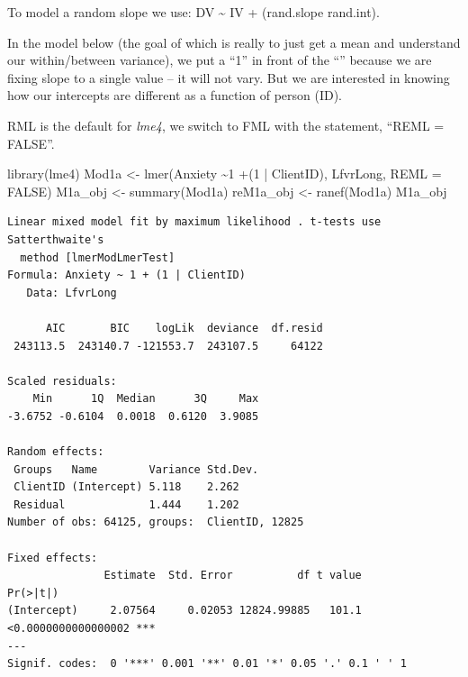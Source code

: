 \documentclass[
  11pt,
]{book}
\newenvironment{Shaded}{\begin{snugshade}}{\end{snugshade}}
\newcommand{\AttributeTok}[1]{\textcolor[rgb]{0.77,0.63,0.00}{#1}}
\newcommand{\ConstantTok}[1]{\textcolor[rgb]{0.00,0.00,0.00}{#1}}
\newcommand{\DecValTok}[1]{\textcolor[rgb]{0.00,0.00,0.81}{#1}}
\newcommand{\FunctionTok}[1]{\textcolor[rgb]{0.00,0.00,0.00}{#1}}
\newcommand{\NormalTok}[1]{#1}
\newcommand{\OtherTok}[1]{\textcolor[rgb]{0.56,0.35,0.01}{#1}}
\newcommand{\SpecialCharTok}[1]{\textcolor[rgb]{0.00,0.00,0.00}{#1}}
\begin{document}
To model a random slope we use: DV \textasciitilde{} IV + (rand.slope \textbar{} rand.int).

In the model below (the goal of which is really to just get a mean and understand our within/between variance), we put a ``1'' in front of the ``\textbar{}'' because we are fixing slope to a single value -- it will not vary. But we are interested in knowing how our intercepts are different as a function of person (ID).

RML is the default for \emph{lme4}, we switch to FML with the statement, ``REML = FALSE''.

\begin{Shaded}
\begin{Highlighting}[]
\FunctionTok{library}\NormalTok{(lme4)}
\NormalTok{Mod1a }\OtherTok{\textless{}{-}} \FunctionTok{lmer}\NormalTok{(Anxiety }\SpecialCharTok{\textasciitilde{}}\DecValTok{1} \SpecialCharTok{+}\NormalTok{(}\DecValTok{1} \SpecialCharTok{|}\NormalTok{ ClientID), LfvrLong, }\AttributeTok{REML =} \ConstantTok{FALSE}\NormalTok{)}
\NormalTok{M1a\_obj }\OtherTok{\textless{}{-}} \FunctionTok{summary}\NormalTok{(Mod1a)}
\NormalTok{reM1a\_obj }\OtherTok{\textless{}{-}} \FunctionTok{ranef}\NormalTok{(Mod1a)}
\NormalTok{M1a\_obj}
\end{Highlighting}
\end{Shaded}

\begin{verbatim}
Linear mixed model fit by maximum likelihood . t-tests use Satterthwaite's
  method [lmerModLmerTest]
Formula: Anxiety ~ 1 + (1 | ClientID)
   Data: LfvrLong

      AIC       BIC    logLik  deviance  df.resid 
 243113.5  243140.7 -121553.7  243107.5     64122 

Scaled residuals: 
    Min      1Q  Median      3Q     Max 
-3.6752 -0.6104  0.0018  0.6120  3.9085 

Random effects:
 Groups   Name        Variance Std.Dev.
 ClientID (Intercept) 5.118    2.262   
 Residual             1.444    1.202   
Number of obs: 64125, groups:  ClientID, 12825

Fixed effects:
               Estimate  Std. Error          df t value            Pr(>|t|)    
(Intercept)     2.07564     0.02053 12824.99885   101.1 <0.0000000000000002 ***
---
Signif. codes:  0 '***' 0.001 '**' 0.01 '*' 0.05 '.' 0.1 ' ' 1
\end{verbatim}
\end{document}
